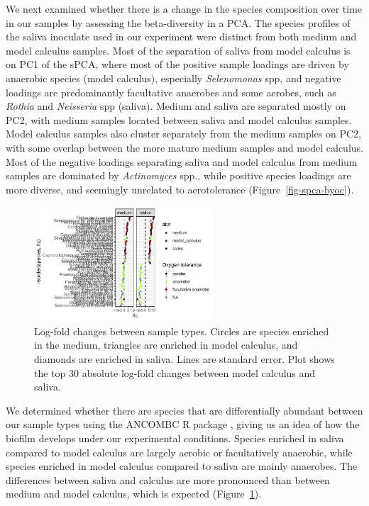 \documentclass[10pt,a4paper]{article}
\begin{document}
We next examined whether there is a change in the species composition
over time in our samples by assessing the beta-diversity in a PCA. The
species profiles of the saliva inoculate used in our experiment were
distinct from both medium and model calculus samples. Most of the
separation of saliva from model calculus is on PC1 of the sPCA, where
most of the positive sample loadings are driven by anaerobic species
(model calculus), especially \emph{Selenomonas} spp, and negative
loadings are predominantly facultative anaerobes and some aerobes, such
as \emph{Rothia} and \emph{Neisseria} spp (saliva). Medium and saliva
are separated mostly on PC2, with medium samples located between saliva
and model calculus samples. Model calculus samples also cluster
separately from the medium samples on PC2, with some overlap between the
more mature medium samples and model calculus. Most of the negative
loadings separating saliva and model calculus from medium samples are
dominated by \emph{Actinomyces} spp., while positive species loadings
are more diverse, and seemingly unrelated to aerotolerance
(Figure~\ref{fig-spca-byoc}).

\begin{figure}
    \centering
    \includegraphics[width=0.6\textwidth]{figures/fig-diffabund-byoc-1.pdf}
    \caption{\label{fig-diffabund-byoc}Log-fold changes between sample
types. Circles are species enriched in the medium, triangles are
enriched in model calculus, and diamonds are enriched in saliva. Lines
are standard error. Plot shows the top 30 absolute log-fold changes
between model calculus and saliva.}
\end{figure}

We determined whether there are species that are differentially abundant
between our sample types using the ANCOMBC R package
\citep{linANCOMBC2020}, giving us an idea of how the biofilm develops
under our experimental conditions. Species enriched in saliva compared
to model calculus are largely aerobic or facultatively anaerobic, while
species enriched in model calculus compared to saliva are mainly
anaerobes. The differences between saliva and calculus are more
pronounced than between medium and model calculus, which is expected
(Figure~\ref{fig-diffabund-byoc}).
\end{document}
